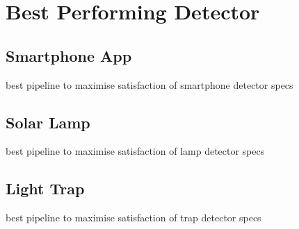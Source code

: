 \section{Best Performing Detector}
\label{sec:best}

    \subsection{Smartphone App}
    \label{subsec:best-phone}
        best pipeline to maximise satisfaction of smartphone detector specs
    
    \subsection{Solar Lamp}
    \label{subsec:best-lamp}
        best pipeline to maximise satisfaction of lamp detector specs
    
    \subsection{Light Trap}
    \label{subsec:best-trap}
        best pipeline to maximise satisfaction of trap detector specs
    
    